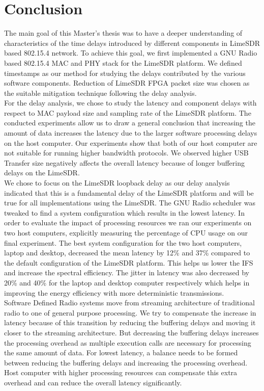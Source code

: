 \chapter{Conclusion}

The main goal of this Master’s thesis was to have a deeper understanding of characteristics of the time delays introduced by different components in LimeSDR based 802.15.4 network. To achieve this goal, we first implemented a GNU Radio based 802.15.4 MAC and PHY stack for the LimeSDR platform. We defined timestamps as our method for studying the delays contributed by the various software components. Reduction of LimeSDR FPGA packet size was chosen as the suitable mitigation technique following the delay analysis. \\

For the delay analysis, we chose to study the latency and component delays with respect to MAC payload size and sampling rate of the LimeSDR platform. The conducted experiments allow us to draw a general conclusion that increasing the amount of data increases the latency due to the larger software processing delays on the host computer. Our experiments show that both of our host computer are not suitable for running higher bandwidth protocols. We observed higher USB Transfer size negatively affects the overall latency because of longer buffering delays on the LimeSDR.\\

We chose to focus on the LimeSDR loopback delay as our delay analysis indicated that this is a fundamental delay of the LimeSDR platform and will be true for all implementations using the LimeSDR. The GNU Radio scheduler was tweaked to find a system configuration which results in the lowest latency. In order to evaluate the impact of processing resources we ran our experiments on two host computers, explicitly measuring the percentage of CPU usage on our final experiment.
The best system configuration for the two host computers, laptop and desktop, decreased the mean latency by 12\% and 37\% compared to the default configuration of the LimeSDR platform.
This helps us lower the \ac{IFS} and increase the spectral efficiency.
The jitter in latency was also decreased by 20\% and 40\% for the laptop and desktop computer respectively which helps in improving the energy efficiency with more deterministic transmissions.\\


Software Defined Radio systems move from streaming architecture of traditional radio to one of general purpose processing. We try to compensate the increase in latency because of this transition by reducing the buffering delays and moving it closer to the streaming architecture. But decreasing the buffering delays increases the processing overhead as multiple execution calls are necessary for processing the same amount of data. For lowest latency, a balance needs to be formed between reducing the buffering delays and increasing the processing overhead. Host computer with higher processing resources can compensate this extra overhead and can reduce the overall latency significantly.\\

